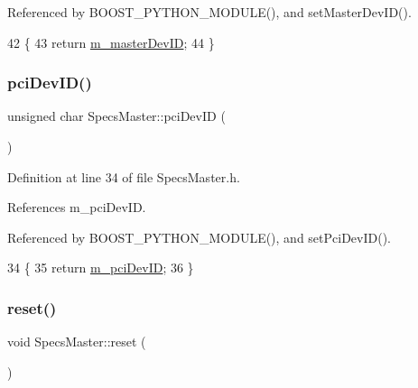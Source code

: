 Referenced by B\+O\+O\+S\+T\+\_\+\+P\+Y\+T\+H\+O\+N\+\_\+\+M\+O\+D\+U\+L\+E(), and set\+Master\+Dev\+I\+D().


\begin{DoxyCode}
42                              \{
43     \textcolor{keywordflow}{return} \hyperlink{classSpecsMaster_a46913a84dbe228a115ee1b90c82e44e2}{m\_masterDevID};
44   \}
\end{DoxyCode}
\mbox{\label{classSpecsMaster_af4c88071a81c706e2a30ec7786aea707}} 
\subsubsection{\texorpdfstring{pci\+Dev\+I\+D()}{pciDevID()}}
{\footnotesize\ttfamily unsigned char Specs\+Master\+::pci\+Dev\+ID (\begin{DoxyParamCaption}{ }\end{DoxyParamCaption})\hspace{0.3cm}{\ttfamily [inline]}}



Definition at line 34 of file Specs\+Master.\+h.



References m\+\_\+pci\+Dev\+ID.



Referenced by B\+O\+O\+S\+T\+\_\+\+P\+Y\+T\+H\+O\+N\+\_\+\+M\+O\+D\+U\+L\+E(), and set\+Pci\+Dev\+I\+D().


\begin{DoxyCode}
34                           \{
35     \textcolor{keywordflow}{return} \hyperlink{classSpecsMaster_a1a2b2ea916633b7eaee63589946e8909}{m\_pciDevID};
36   \}
\end{DoxyCode}
\mbox{\label{classSpecsMaster_a0cbd251edefae5f154ec21b1b944d153}} 
\subsubsection{\texorpdfstring{reset()}{reset()}}
{\footnotesize\ttfamily void Specs\+Master\+::reset (\begin{DoxyParamCaption}{ }\end{DoxyParamCaption})\hspace{0.3cm}{\ttfamily [virtual]}}

